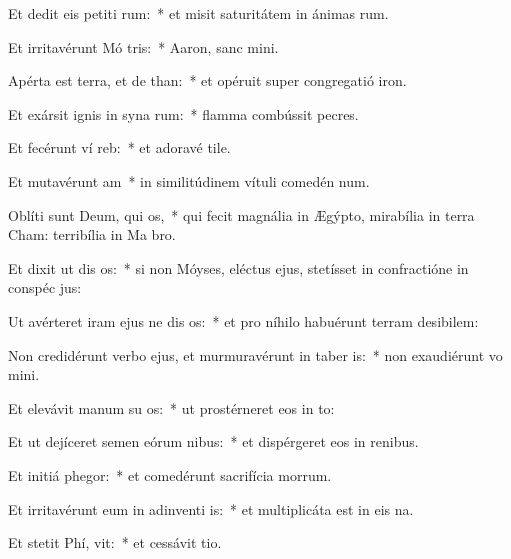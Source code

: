 \item Et dedit eis petiti rum:~* et misit saturitátem in ánimas rum.
\item Et irritavérunt Mó  tris:~* Aaron, sanc mini.
\item Apérta est terra, et de than:~* et opéruit super congregatió iron.
\item Et exársit ignis in syna rum:~* flamma combússit pecres.
\item Et fecérunt ví  reb:~* et adoravé tile.
\item Et mutavérunt  am~* in similitúdinem vítuli comedén num.
\item Oblíti sunt Deum, qui  os,~* qui fecit magnália in Ægýpto, mirabília in terra Cham: terribília in Ma bro.
\item Et dixit ut dis os:~* si non Móyses, eléctus ejus, stetísset in confractióne in conspéc jus:
\item Ut avérteret iram ejus ne dis os:~* et pro níhilo habuérunt terram desibilem:
\item Non credidérunt verbo ejus, et murmuravérunt in taber is:~* non exaudiérunt vo mini.
\item Et elevávit manum su  os:~* ut prostérneret eos in to:
\item Et ut dejíceret semen eórum  nibus:~* et dispérgeret eos in renibus.
\item Et initiá  phegor:~* et comedérunt sacrifícia morrum.
\item Et irritavérunt eum in adinventi is:~* et multiplicáta est in eis na.
\item Et stetit Phí,  vit:~* et cessávit tio.
